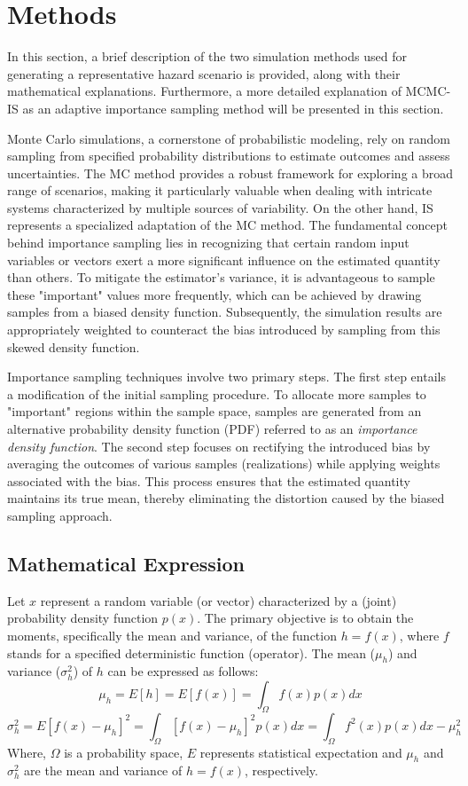 \section{Methods}  
    In this section, a brief description of the two simulation methods used for generating a representative hazard scenario is provided, along with their mathematical explanations. Furthermore, a more detailed explanation of MCMC-IS as an adaptive importance sampling method will be presented in this section.
    
    Monte Carlo simulations, a cornerstone of probabilistic modeling, rely on random sampling from specified probability distributions to estimate outcomes and assess uncertainties. The MC method provides a robust framework for exploring a broad range of scenarios, making it particularly valuable when dealing with intricate systems characterized by multiple sources of variability. On the other hand, IS represents a specialized adaptation of the MC method. The fundamental concept behind importance sampling lies in recognizing that certain random input variables or vectors exert a more significant influence on the estimated quantity than others. To mitigate the estimator's variance, it is advantageous to sample these "important" values more frequently, which can be achieved by drawing samples from a biased density function. Subsequently, the simulation results are appropriately weighted to counteract the bias introduced by sampling from this skewed density function.

    Importance sampling techniques involve two primary steps. The first step entails a modification of the initial sampling procedure. To allocate more samples to "important" regions within the sample space, samples are generated from an alternative probability density function (PDF) referred to as an \textit{importance density function}. The second step focuses on rectifying the introduced bias by averaging the outcomes of various samples (realizations) while applying weights associated with the bias. This process ensures that the estimated quantity maintains its true mean, thereby eliminating the distortion caused by the biased sampling approach.
        
    \subsection{Mathematical Expression}
        Let $x$ represent a random variable (or vector) characterized by a (joint) probability density function $p(x)$. The primary objective is to obtain the moments, specifically the mean and variance, of the function $h = f(x)$, where $f$ stands for a specified deterministic function (operator). The mean ($\mu_h$) and variance ($\sigma_h^2$) of $h$ can be expressed as follows:
        $$\mu_h=E[h]=E[f(x)]=\int_\Omega f(x)p(x)dx$$
        $$\sigma_h^2=E{[f(x)-\mu_h]^2}=\int_\Omega[f(x)-\mu_h]^2 p(x)dx = \int_\Omega f^2(x)p(x)dx-\mu^2_h$$
        Where, $\Omega$ is a probability space, $E$ represents statistical expectation and $\mu_h$ and $\sigma_h^2$ are the mean and variance of $h=f(x)$, respectively. 
        
